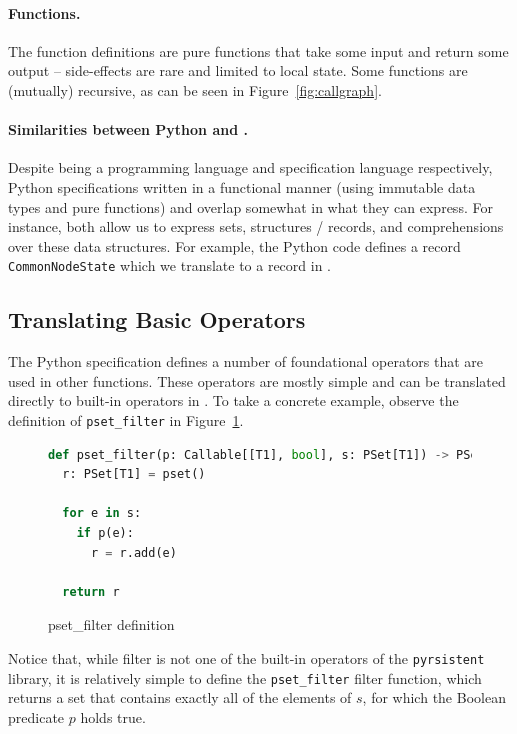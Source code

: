 \paragraph{Functions.} The function definitions are pure functions that
take some input and return some output -- side-effects are rare and limited to
local state. Some functions are
(mutually) recursive, as can be seen in Figure~\ref{fig:callgraph}.

\paragraph{Similarities between Python and \tlap{}.} Despite being a programming
language and specification language respectively, Python specifications written
in a functional manner (using immutable data types and pure functions) and
\tlap{} overlap somewhat in what they can express. For instance, both allow us
to express sets, structures / records, and comprehensions over these data
structures. For example, the Python code defines a record
\texttt{CommonNodeState} which we translate to a record in \tlap{}.

\subsection{Translating Basic Operators}

The Python specification defines a number of
foundational operators that are used in other functions. These operators are
mostly simple and can be translated directly to built-in operators in \tlap{}.
To take a concrete example, observe the definition of \texttt{pset\_filter} in
Figure~\ref{py_filter}.

\begin{figure}
  \begin{lstlisting}[language=Python,style=mystyle]
def pset_filter(p: Callable[[T1], bool], s: PSet[T1]) -> PSet[T1]:
  r: PSet[T1] = pset()
 
  for e in s:
    if p(e):
      r = r.add(e)
  
  return r\end{lstlisting}
\caption{\textsf{pset\_filter} definition\label{py_filter}}
\end{figure}

Notice that, while filter is not one of the built-in operators of the
\texttt{pyrsistent} library, it is relatively simple to define the
\texttt{pset\_filter} filter function, which returns a set that contains exactly
all of the elements of $s$, for which the Boolean predicate $p$ holds true.

